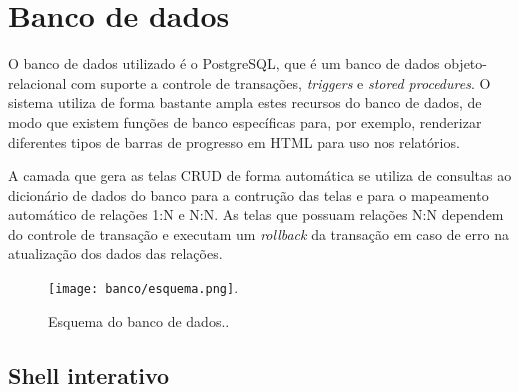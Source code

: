 \documentclass[9pt]{report}
\begin{document}
   \chapter{Banco de dados}

   O banco de dados utilizado é o PostgreSQL, que é um
   banco de dados objeto-relacional com suporte a controle
   de transações, \textit{triggers} e \textit{stored procedures}.
   O sistema utiliza de forma bastante ampla estes recursos do
   banco de dados, de modo que existem funções de banco
   específicas para, por exemplo, renderizar diferentes tipos
   de barras de progresso em HTML para uso nos relatórios.

   A camada que gera as telas CRUD de forma automática se utiliza
   de consultas ao dicionário de dados do banco para a
   contrução das telas e para o mapeamento automático de
   relações 1:N e N:N. As telas que possuam relações N:N
   dependem do controle de transação e executam um \textit{rollback}
   da transação em caso de erro na atualização dos dados das
   relações.


     \begin{figure}[H]
       \texttt{[image: banco/esquema.png]}.
       \caption{Esquema do banco de dados..}
       \label{fig:dbSchema}
     \end{figure}

   
    \section{Shell interativo}
    
\end{document}

